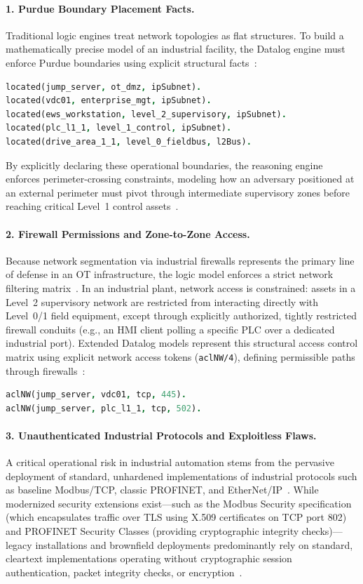 \documentclass[target=mst,aauheader=aics,style=]{thud}
\begin{document}
\paragraph{1. Purdue Boundary Placement Facts.}
Traditional logic engines treat network topologies as flat structures. To build a mathematically precise model of an industrial facility, the Datalog engine must enforce Purdue boundaries using explicit structural facts~\cite{SunderOT}:
\begin{lstlisting}[language=Prolog]
located(jump_server, ot_dmz, ipSubnet).
located(vdc01, enterprise_mgt, ipSubnet).
located(ews_workstation, level_2_supervisory, ipSubnet).
located(plc_l1_1, level_1_control, ipSubnet).
located(drive_area_1_1, level_0_fieldbus, l2Bus).
\end{lstlisting}
By explicitly declaring these operational boundaries, the reasoning engine enforces perimeter-crossing constraints, modeling how an adversary positioned at an external perimeter must pivot through intermediate supervisory zones before reaching critical Level~1 control assets~\cite{SunderOT}.

\paragraph{2. Firewall Permissions and Zone-to-Zone Access.}
Because network segmentation via industrial firewalls represents the primary line of defense in an OT infrastructure, the logic model enforces a strict network filtering matrix~\cite{SunderOT}. In an industrial plant, network access is constrained: assets in a Level~2 supervisory network are restricted from interacting directly with Level~0/1 field equipment, except through explicitly authorized, tightly restricted firewall conduits (e.g., an HMI client polling a specific PLC over a dedicated industrial port). Extended Datalog models represent this structural access control matrix using explicit network access tokens (\texttt{aclNW/4}), defining permissible paths through firewalls~\cite{Ou05, SunderOT}:
\begin{lstlisting}[language=Prolog]
aclNW(jump_server, vdc01, tcp, 445).
aclNW(jump_server, plc_l1_1, tcp, 502).
\end{lstlisting}

\paragraph{3. Unauthenticated Industrial Protocols and Exploitless Flaws.}
A critical operational risk in industrial automation stems from the pervasive deployment of standard, unhardened implementations of industrial protocols such as baseline Modbus/TCP, classic PROFINET, and EtherNet/IP~\cite{StanExtended, SunderOT}. While modernized security extensions exist---such as the Modbus Security specification (which encapsulates traffic over TLS using X.509 certificates on TCP port 802) and PROFINET Security Classes (providing cryptographic integrity checks)---legacy installations and brownfield deployments predominantly rely on standard, cleartext implementations operating without cryptographic session authentication, packet integrity checks, or encryption~\cite{StanExtended, SunderOT}. 
\end{document}
